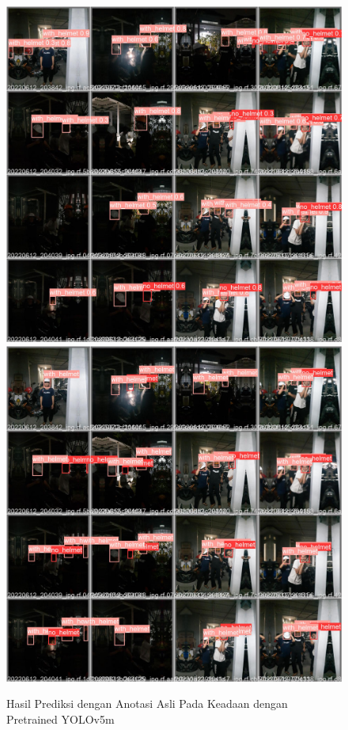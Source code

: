 \begin{figure}[ht]
  \centering
  \includegraphics[scale=0.1]{gambar/train_v2_val/low_ligjt/customNano/val_batch0_pred.jpg}
  \includegraphics[scale=0.1]{gambar/train_v2_val/low_ligjt/customNano/val_batch0_labels.jpg}
  \caption{Hasil Prediksi dengan Anotasi Asli Pada Keadaan dengan Pretrained YOLOv5m}
\end{figure}


